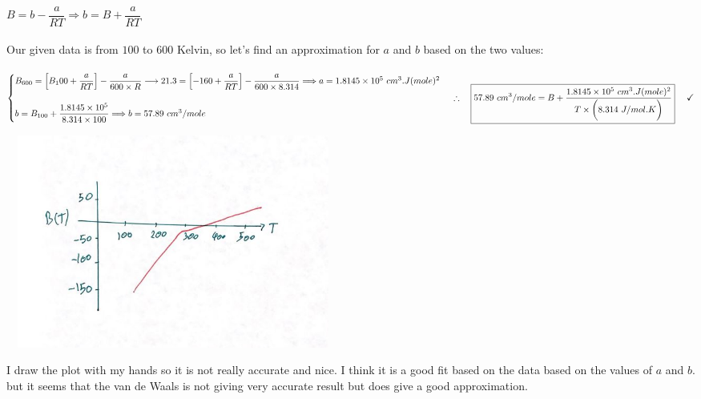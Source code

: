 \documentclass[fleqn]{article}
\begin{document}
\begin{enumerate}
\begin{enumerate}
        \textcolor{hwColor}{
          \\
          $
            B=b-\dfrac{a}{RT} \Longrightarrow b=B+\dfrac{a}{RT}
          $
          \\
          \\
          Our given data is from $100$ to $600$ Kelvin, so let's find an approximation for $a$ and $b$ based on the two values:
          \\
          \\
          $
            \begin{cases}
              B_{600}= \left[B_100+\dfrac{a}{RT}\right]-\dfrac{a}{600 \times R} 
              \longrightarrow 21.3= \left[-160+\dfrac{a}{RT}\right]-\dfrac{a}{600 \times 8.314} \Longrightarrow a=1.8145 \times 10^5 ~ cm^3.J(mole)^2
              \\
              \\
              b=B_{100}+\dfrac{1.8145 \times 10^5}{8.314 \times 100} \Longrightarrow b=57.89 ~ cm^3/mole
            \end{cases}
            \\
            \\
            \\
            \therefore ~~~ \boxed{
              57.89 ~ cm^3/mole=B+\dfrac{1.8145 \times 10^5 ~ cm^3.J(mole)^2}{T \times \bigg( 8.314 ~ J/mol.K \bigg)}
            } ~~~~ \checkmark
          $
        }

        \begin{center}
          \includegraphics[height=7cm, width=11cm]{1.JPG}
        \end{center}

        \textcolor{hwColor}{
          I draw the plot with my hands so it is not really accurate and nice. I think it is a good fit based on the data based on 
          the values of $a$ and $b$. but it seems that the van de Waals is not giving very accurate result but does give a good approximation.
          \\
          \\
        }


\end{enumerate}
\end{enumerate}
\end{document}
